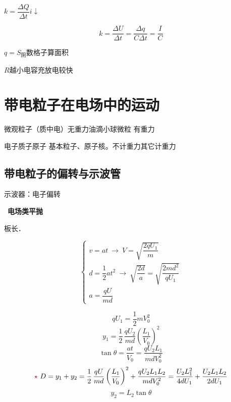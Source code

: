 $k=\dfrac{\Delta Q}{\Delta t}$\qquad $i\downarrow$


\[
k=\frac{\Delta U}{\Delta t}=\frac{\Delta q}{C\Delta t}=\frac{I}{C}
\]


$q=S_{\text{阴}}$\qquad 数格子算面积 %

$R$越小\quad 电容充放电较快


\section{带电粒子在电场中的运动}
微观粒子（质中电）无重力\qquad 油滴小球微粒 有重力

电子质子原子 %
基本粒子、原子核。不计重力\quad 其它计重力

\subsection{带电粒子的偏转与示波管}
示波器：电子偏转\quad {} %

\ \textbf{电场类平抛}


板长．

\[
\begin{cases}
v=at\ \to\ V=\sqrt{\dfrac{2qU_1}{m}}\\[6pt]
d=\dfrac{1}{2}at^{2}\ \to\ \sqrt{\dfrac{2d}{a}}=\sqrt{\dfrac{2md^{2}}{qU_1}}\\[6pt]
a=\dfrac{qU}{md}
\end{cases}
\]

\[ qU_1=\frac{1}{2}mV_0^{2} \]
\[ y_1=\frac{1}{2}\,\frac{qU_2}{md}\left(\frac{L_1}{V_0}\right)^{2} \]
\[ \tan\theta=\frac{at}{V_0}=\frac{qU_2L_1}{mdV_0^{2}} \]
\[ \red{\star}\ D=y_1+y_2=\frac{1}{2}\,\frac{qU}{md}\left(\frac{L_1}{V_0}\right)^{2}+\frac{qU_2L_1L_2}{mdV_0^{2}}=\frac{U_2L_1^{2}}{4dU_1}+\frac{U_2L_1L_2}{2dU_1} \]
\[ y_2=L_2\tan\theta \]

